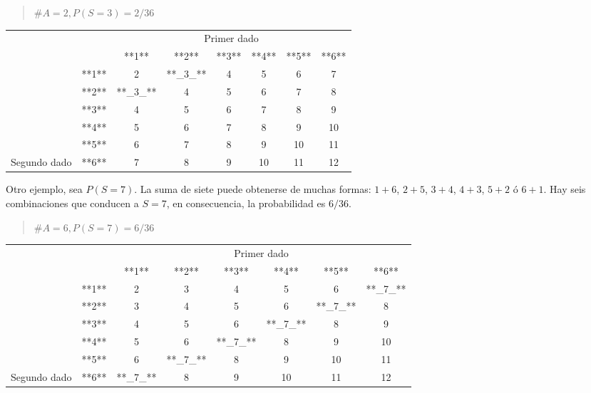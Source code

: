 \documentclass[]{article}
\begin{document}
\begin{quote}
\(\#A = 2, P(S = 3)=2/36\)
\end{quote}

\begin{table}[H]
\centering
\begin{tabular}{lccccccc}
\toprule
\multicolumn{2}{c}{ } & \multicolumn{6}{c}{Primer dado} \\
\cmidrule(l{3pt}r{3pt}){3-8}
 &  & **1** & **2** & **3** & **4** & **5** & **6**\\
\midrule
\rowcolor{gray!6}   & **1** & 2 & **\_3\_** & 4 & 5 & 6 & 7\\
\cmidrule{2-8}
 & **2** & **\_3\_** & 4 & 5 & 6 & 7 & 8\\
\cmidrule{2-8}
\rowcolor{gray!6}   & **3** & 4 & 5 & 6 & 7 & 8 & 9\\
\cmidrule{2-8}
 & **4** & 5 & 6 & 7 & 8 & 9 & 10\\
\cmidrule{2-8}
\rowcolor{gray!6}   & **5** & 6 & 7 & 8 & 9 & 10 & 11\\
\cmidrule{2-8}
\multirow[t]{-6}{*}{\raggedright\arraybackslash Segundo dado} & **6** & 7 & 8 & 9 & 10 & 11 & 12\\
\bottomrule
\end{tabular}
\end{table}

Otro ejemplo, sea \(P(S=7)\). La suma de siete puede obtenerse de muchas
formas: \(1+6\), \(2+5\), \(3+4\), \(4+3\), \(5+2\) ó \(6+1\). Hay seis
combinaciones que conducen a \(S=7\), en consecuencia, la probabilidad
es \(6/36\).

\begin{quote}
\(\#A = 6, P(S = 7)=6/36\)
\end{quote}

\begin{table}[H]
\centering
\begin{tabular}{lccccccc}
\toprule
\multicolumn{2}{c}{ } & \multicolumn{6}{c}{Primer dado} \\
\cmidrule(l{3pt}r{3pt}){3-8}
 &  & **1** & **2** & **3** & **4** & **5** & **6**\\
\midrule
\rowcolor{gray!6}   & **1** & 2 & 3 & 4 & 5 & 6 & **\_7\_**\\
\cmidrule{2-8}
 & **2** & 3 & 4 & 5 & 6 & **\_7\_** & 8\\
\cmidrule{2-8}
\rowcolor{gray!6}   & **3** & 4 & 5 & 6 & **\_7\_** & 8 & 9\\
\cmidrule{2-8}
 & **4** & 5 & 6 & **\_7\_** & 8 & 9 & 10\\
\cmidrule{2-8}
\rowcolor{gray!6}   & **5** & 6 & **\_7\_** & 8 & 9 & 10 & 11\\
\cmidrule{2-8}
\multirow[t]{-6}{*}{\raggedright\arraybackslash Segundo dado} & **6** & **\_7\_** & 8 & 9 & 10 & 11 & 12\\
\bottomrule
\end{tabular}
\end{table}
\end{document}
